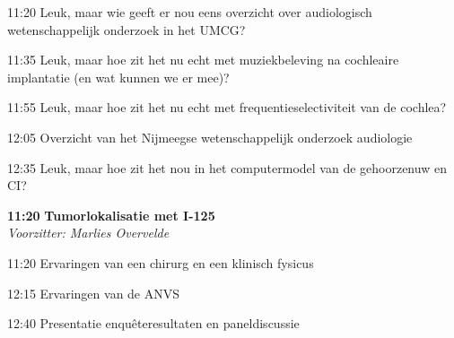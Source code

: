 \documentclass[a4paper,10pt]{report}
\begin{document}
\begin{multicols*}{3}

\begin{packed_enum}
\item[11:20] Leuk, maar wie geeft er nou eens overzicht over audiologisch wetenschappelijk onderzoek in het UMCG?
\item[11:35] Leuk, maar hoe zit het nu echt met muziekbeleving na cochleaire implantatie (en wat kunnen we er mee)?
\item[11:55] Leuk, maar hoe zit het nu echt met frequentieselectiviteit van de cochlea?
\item[12:05] Overzicht van het Nijmeegse wetenschappelijk onderzoek audiologie
\item[12:35] Leuk, maar hoe zit het nou in het computermodel van de gehoorzenuw en CI?
\end{packed_enum} %

\vfill

\begin{packed_enum}
\item[\textbf{11:20}]\textbf{Tumorlokalisatie met I-125}\\\textit{Voorzitter: Marlies Overvelde}
\item[11:20] Ervaringen van een chirurg en een klinisch fysicus
\item[12:15] Ervaringen van de ANVS
\item[12:40] Presentatie enquêteresultaten en paneldiscussie
\end{packed_enum} %


\end{multicols*}
\end{document}
